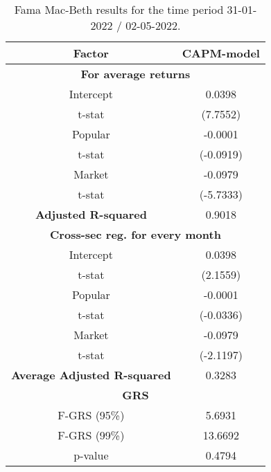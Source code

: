 \begin{table}[h!]
	\centering
	\captionsetup{skip=0.5\baselineskip}
	\caption{Fama Mac-Beth results for the time period 31-01-2022 / 02-05-2022.}
	\begin{tabular}{|c|c|}
		\hline
		\textbf{Factor} & \textbf{CAPM-model} \\ \hline
		\multicolumn{2}{|c|}{\textbf{For average returns}} \\ \hline
		Intercept & 0.0398 \\ 
		t-stat & (7.7552) \\ \hline
		Popular & -0.0001 \\ 
		t-stat & (-0.0919)\\ \hline
		Market & -0.0979 \\
		t-stat & (-5.7333)\\ \hline
		\textbf{Adjusted R-squared} & 0.9018 \\ \hline
		\multicolumn{2}{|c|}{\textbf{Cross-sec reg. for every month}} \\ \hline
		Intercept & 0.0398 \\ 
		t-stat & (2.1559) \\ \hline
		Popular & -0.0001 \\ 
		t-stat & (-0.0336)\\ \hline
		Market & -0.0979 \\
		t-stat & (-2.1197)\\ \hline
		\textbf{Average Adjusted R-squared} & 0.3283 \\ \hline
		\multicolumn{2}{|c|}{\textbf{GRS}} \\ \hline
		F-GRS (95\%) & 5.6931 \\ \hline
		F-GRS (99\%) & 13.6692 \\ \hline
		p-value & 0.4794 \\ \hline
	\end{tabular}
\end{table}
